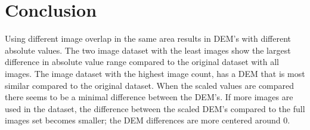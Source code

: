 \documentclass{isprs} %
\begin{document}
\section{Conclusion}
Using different image overlap in the same area results in DEM's with different absolute values.
The two image dataset with the least images show the largest difference in absolute value range compared to the original dataset with all images. 
The image dataset with the highest image count, has a DEM that is most similar compared to the original dataset.
When the scaled values are compared there seems to be a minimal difference between the DEM's.
If more images are used in the dataset, the difference between the scaled DEM's compared to the full images set becomes smaller; the DEM differences are more centered around 0.


\sloppy




{
	\begin{spacing}{1.17}
		\normalsize
	\end{spacing}
}



\vspace{1cm}
\end{document}
